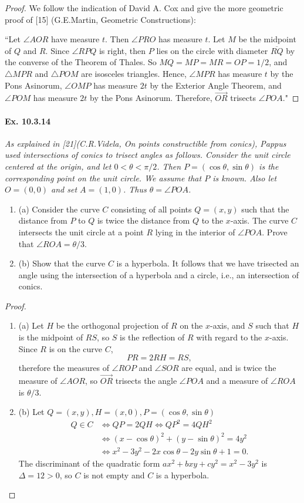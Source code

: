 \documentclass[11pt,a4paper]{article}
\newcommand{\be} {\begin{enumerate}}
\newcommand{\ee} {\end{enumerate}}
\begin{document}
\begin{proof}
We follow the indication of David A. Cox and give the more geometric proof of [15] (G.E.Martin, Geometric Constructions):

``Let $\angle AOR$ have measure $t$. Then $\angle PRO$ has measure $t$. Let $M$ be the midpoint of $Q$ and $R$. Since $\angle RPQ$ is right, then $P$ lies on the circle with diameter $\overline{RQ}$ by the converse of the Theorem of Thales. So $MQ = MP = MR = OP = 1/2$, and $\triangle MPR$ and $\triangle POM$ are isosceles triangles. Hence, $\angle MPR$ has measure $t$ by the Pons Asinorum, $\angle OMP$ has measure $2t$ by the Exterior Angle Theorem, and $\angle POM$ has measure $2t$ by the Pons Asinorum. Therefore, $\overrightarrow{OR}$ trisects $\angle POA$."
\end{proof}

\paragraph{Ex. 10.3.14}

{\it As explained in [21](C.R.Videla, {\it On points constructible from conics}), Pappus used intersections of conics to trisect angles as follows. Consider the unit circle centered at the origin, and let $0<\theta < \pi/2$. Then $P = (\cos \theta, \sin \theta)$ is the corresponding point on the unit circle. We assume that $P$ is known. Also let $O =(0,0)$ and set $A = (1,0)$. Thus $\theta = \angle POA$.
\be
\item[(a)] Consider the curve $C$ consisting of all points $Q = (x,y)$ such that the distance from $P$ to $Q$ is twice the distance from $Q$ to the $x$-axis. The curve $C$ intersects the unit circle at a point $R$ lying in the interior of $\angle POA$. Prove that $\angle ROA = \theta/3$.
\item[(b)] Show that the curve $C$ is a hyperbola. It follows that we have trisected an angle using the intersection of a hyperbola and a circle, i.e., an intersection of conics.
\ee
}

\begin{proof}
\be
\item[(a)]
Let $H$ be the orthogonal projection of $R$ on the $x$-axis, and $S$ such that $H$ is the midpoint  of $RS$, so $S$ is the reflection of $R$ with regard to the $x$-axis. Since $R$ is on the curve $C$,
$$PR = 2 RH = RS,$$
therefore the measures of $\angle ROP$ and $\angle SOR$ are equal, and is twice the measure of $\angle AOR$, so $\overrightarrow{OR}$ trisects the angle $\angle POA$ and a measure of $\angle ROA$ is $\theta/3$.

\item[(b)] Let $Q=(x,y), H = (x,0), P = (\cos \theta, \sin \theta)$
\begin{align*}
Q \in C &\iff QP = 2 QH \iff QP^2 = 4 QH^2\\
&\iff(x- \cos \theta)^2 + (y-\sin \theta)^2 = 4 y^2\\
& \iff x^2 - 3 y^2  - 2 x \cos \theta  - 2 y \sin \theta +1 = 0.
\end{align*}
The discriminant of the quadratic form $a x^2 + bxy + cy^2 = x^2-3y^2$ is $\Delta = 12>0$, so $C$ is not empty and $C$ is a hyperbola.
\ee
\end{proof}
\end{document}
